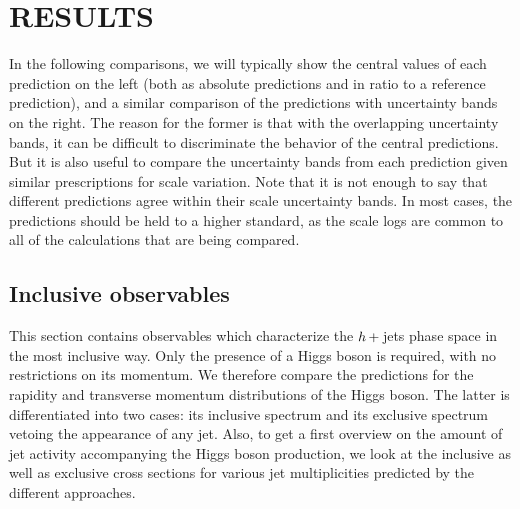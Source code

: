 \section{RESULTS}
\label{sec:hjetscomp:results}

In the following comparisons, we will typically show the central
values of each prediction on the left (both as absolute predictions
and in ratio to a reference prediction), and a similar comparison of
the predictions with uncertainty bands on the right. The reason for
the former is that with the overlapping uncertainty bands, it can be
difficult to discriminate the behavior of the central predictions. But
it is also useful to compare the uncertainty bands from each
prediction given similar prescriptions for scale variation.  Note that
it is not enough to say that different predictions agree within their
scale uncertainty bands. In most cases, the predictions should be held
to a higher standard, as the scale logs are common to all of the
calculations that are being compared.

\Rivet \cite{Buckley:2010ar}







\subsection{Inclusive observables}
\label{sec:hjetscomp:results:inclobs}

This section contains observables which characterize the $h\!\text{~+~}\!$jets
phase space in the most inclusive way. Only the presence of a Higgs
boson is required, with no restrictions on its momentum. We therefore
compare the predictions for the rapidity and transverse momentum
distributions of the Higgs boson. The latter is differentiated into
two cases: its inclusive spectrum and its exclusive spectrum vetoing
the appearance of any jet. Also, to get a first overview on the amount
of jet activity accompanying the Higgs boson production, we look at
the inclusive as well as exclusive cross sections for various jet
multiplicities predicted by the different approaches.


